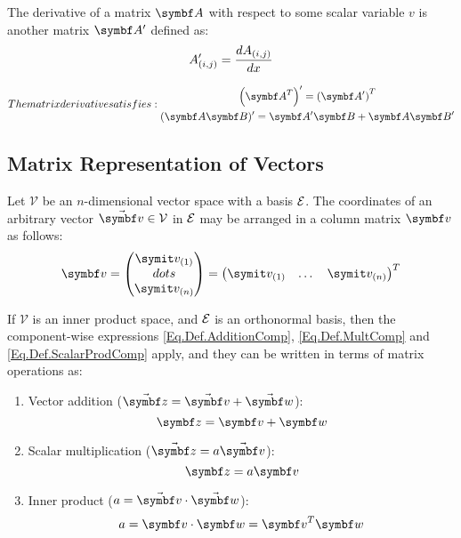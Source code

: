 The derivative of a matrix $\mat{A}$ with respect to some scalar variable $v$ is another matrix $\mat{A}^{\prime}$ defined as:
\begin{equation*}
	A'_{(i,j)} = \frac{dA_{(i,j)}}{dx}
\end{equation*}

\begin{subequations}
The matrix derivative satisfies:
\begin{gather}
\rndp{\tr{\mat{A}}}' = \trp{\mat{A}'} \label{Eq.Res.MatDerTrans} \\
(\mat{A}\mat{B})'=\mat{A}'\mat{B} + \mat{A}\mat{B}' \label{Eq.Res.MatDerProd}
\end{gather}
\end{subequations}

\subsection{Matrix Representation of Vectors} %
Let $\mathcal{V}$ be an $n$-dimensional vector space with a basis $\mathcal{E}_{ }$. The coordinates of an arbitrary vector $\vabs{v} \in \mathcal{V}$ in $\mathcal{E}_{ }$ may be arranged in a column matrix $\mcol{v}$ as follows:
\begin{equation*}
\mcol{v} = 
\matenv{\cmp{v}{1} \\ dots \\ \cmp{v}{n}}
=
\tr{\matenv{\cmp{v}{1} & \dots & \cmp{v}{n}}}
\end{equation*}

If $\mathcal{V}$ is an inner product space, and $\mathcal{E}_{ }$ is an orthonormal basis, then the component-wise expressions \eqref{Eq.Def.AdditionComp}, \eqref{Eq.Def.MultComp} and \eqref{Eq.Def.ScalarProdComp} apply, and they can be written in terms of matrix operations as:

\begin{enumerate}
\item Vector addition ($\vabs{z}=\vabs{v}+\vabs{w}$):
\begin{equation} \label{Eq.Def.VectColMat.Add}
\mcol{z}=\mcol{v}+\mcol{w}
\end{equation}
\item Scalar multiplication ($\vabs{z}=a\vabs{v}$):
\begin{equation} \label{Eq.Def.VectColMat.ScalMult}
\mcol{z}= a\mcol{v}
\end{equation}
\item Inner product ($a=\vabs{v}\cdot\vabs{w}$):
\begin{equation} \label{Eq.Def.VectColMat.InnerProd}
a = \mcol{v} \cdot \mcol{w} = \tr{\mcol{v}}\mcol{w}
\end{equation}
\end{enumerate}

